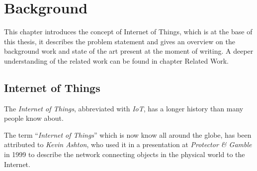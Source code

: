 
\chapter{Background}\label{chapter:background}

	This chapter introduces the concept of Internet of Things, which is at the base of this thesis, it describes the problem statement and gives an overview on the background work and state of the art present at the moment of writing.
	A deeper understanding of the related work can be found in chapter Related Work.
	
	\section{Internet of Things}
	
 		The \textit{Internet of Things}, abbreviated with \textit{IoT}, has a longer history than many people know about.
 		
 		

%		


	The term ``\textit{Internet of Things}'' which is now know all around the globe, has been attributed to \textit{Kevin Ashton}, who used it in a presentation at \textit{Protector \& Gamble} in 1999 \cite{iot_definition} to describe the network connecting objects in the physical world to the Internet.
	
